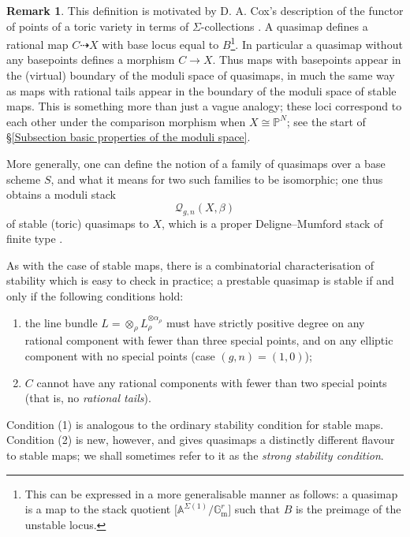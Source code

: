 \documentclass[11pt]{amsart}
\newcommand{\Q}[4]{\mathcal{Q}_{#1,#2}(#3,#4)}
\newcommand{\PP}{\mathbb P}
\renewcommand{\to}{\rightarrow}
\newcommand{\Gm}{\mathbb{G}_{\text{m}}}
\theoremstyle{definition}
\theoremstyle{definition}
\newtheorem{remark}[thm]{Remark}
\newcommand{\ilemph}[1]{\emph{#1}}
\begin{document}
\begin{remark} This definition is motivated by D. A. Cox's description of the functor of points of a toric variety in terms of $\Sigma$-collections \cite{CoxFunctor}. A quasimap defines a rational map $C \dashrightarrow X$ with base locus equal to $B$\footnote{This can be expressed in a more generalisable manner as follows: a quasimap is a map to the stack quotient $\big[\mathbb{A}^{\Sigma(1)} / \Gm^r\big]$ such that $B$ is the preimage of the unstable locus.}.
In particular a quasimap without any basepoints defines a morphism $C \to X$. Thus maps with basepoints appear in the (virtual) boundary of the moduli space of quasimaps, in much the same way as maps with rational tails appear in the boundary of the moduli space of stable maps. This is something more than just a vague analogy; these loci correspond to each other under the comparison morphism when $X\cong\PP^N$; see the start of \S \ref{Subsection basic properties of the moduli space}. \end{remark}

More generally, one can define the notion of a family of quasimaps over a base scheme $S$, and what it means for two such families to be isomorphic; one thus obtains a moduli stack
\begin{equation*} \Q{g}{n}{X}{\beta} \end{equation*}
of stable (toric) quasimaps to $X$, which is a proper Deligne--Mumford stack of finite type \cite[\S 3]{CF-K}.

\medskip

As with the case of stable maps, there is a combinatorial characterisation of stability which is easy to check in practice; a prestable quasimap is stable if and only if the following conditions hold:
\begin{enumerate}
\item the line bundle $L = \otimes_\rho L_\rho^{\otimes \alpha_\rho}$ must have strictly positive degree on any rational component with fewer than three special points, and on any elliptic component with no special points (case $(g,n)=(1,0)$);
\item $C$ cannot have any rational components with fewer than two special points (that is, no \emph{rational tails}).
\end{enumerate}
Condition (1) is analogous to the ordinary stability condition for stable maps. Condition (2) is new, however, and gives quasimaps a distinctly different flavour to stable maps; we shall sometimes refer to it as the \ilemph{strong stability condition}. 
\end{document}
